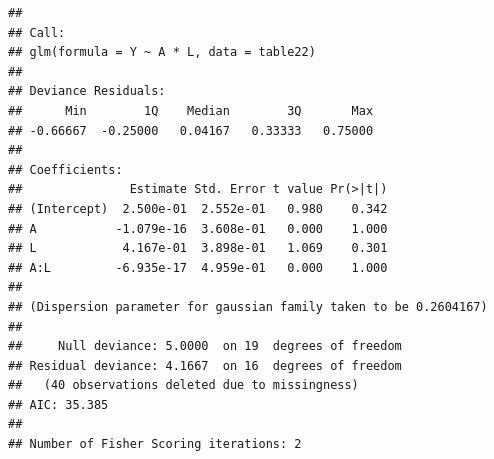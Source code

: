 \documentclass[
  10pt,
]{book}
\newenvironment{Shaded}{\begin{snugshade}}{\end{snugshade}}
\newcommand{\AttributeTok}[1]{\textcolor[rgb]{0.77,0.63,0.00}{#1}}
\newcommand{\ConstantTok}[1]{\textcolor[rgb]{0.00,0.00,0.00}{#1}}
\newcommand{\DecValTok}[1]{\textcolor[rgb]{0.00,0.00,0.81}{#1}}
\newcommand{\FunctionTok}[1]{\textcolor[rgb]{0.00,0.00,0.00}{#1}}
\newcommand{\NormalTok}[1]{#1}
\newcommand{\OtherTok}[1]{\textcolor[rgb]{0.56,0.35,0.01}{#1}}
\newcommand{\SpecialCharTok}[1]{\textcolor[rgb]{0.00,0.00,0.00}{#1}}
\begin{document}
\begin{Shaded}
\end{Shaded}

\begin{verbatim}
## 
## Call:
## glm(formula = Y ~ A * L, data = table22)
## 
## Deviance Residuals: 
##      Min        1Q    Median        3Q       Max  
## -0.66667  -0.25000   0.04167   0.33333   0.75000  
## 
## Coefficients:
##               Estimate Std. Error t value Pr(>|t|)
## (Intercept)  2.500e-01  2.552e-01   0.980    0.342
## A           -1.079e-16  3.608e-01   0.000    1.000
## L            4.167e-01  3.898e-01   1.069    0.301
## A:L         -6.935e-17  4.959e-01   0.000    1.000
## 
## (Dispersion parameter for gaussian family taken to be 0.2604167)
## 
##     Null deviance: 5.0000  on 19  degrees of freedom
## Residual deviance: 4.1667  on 16  degrees of freedom
##   (40 observations deleted due to missingness)
## AIC: 35.385
## 
## Number of Fisher Scoring iterations: 2
\end{verbatim}

\begin{Shaded}
\end{Shaded}
\end{document}
